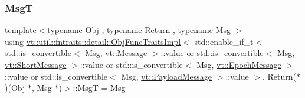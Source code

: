 \subsubsection{\texorpdfstring{MsgT}{MsgT}}
{\footnotesize\ttfamily template$<$typename Obj , typename Return , typename Msg $>$ \\
using \hyperlink{structvt_1_1util_1_1fntraits_1_1detail_1_1_obj_func_traits_impl}{vt\+::util\+::fntraits\+::detail\+::\+Obj\+Func\+Traits\+Impl}$<$ std\+::enable\+\_\+if\+\_\+t$<$ std\+::is\+\_\+convertible$<$ Msg, \hyperlink{namespacevt_a3a3ddfef40b4c90915fa43cdd5f129ea}{vt\+::\+Message} $>$\+::value or std\+::is\+\_\+convertible$<$ Msg, \hyperlink{namespacevt_a1125ac1da6c0bbf141e0ea0739d7602d}{vt\+::\+Short\+Message} $>$\+::value or std\+::is\+\_\+convertible$<$ Msg, \hyperlink{namespacevt_ad67368ffae52d7325002586b41bb150e}{vt\+::\+Epoch\+Message} $>$\+::value or std\+::is\+\_\+convertible$<$ Msg, \hyperlink{namespacevt_a89a92229c5622b855c02c549f83a1a68}{vt\+::\+Payload\+Message} $>$\+::value $>$, Return($\ast$)(Obj $\ast$, Msg $\ast$)$>$\+::\hyperlink{structvt_1_1util_1_1fntraits_1_1detail_1_1_obj_func_traits_impl_3_01std_1_1enable__if__t_3_01std573a703ad4f1a8441021e31e0f1928d5_aec757e31d67acee2fae6ef7c455367db}{MsgT} =  Msg}

